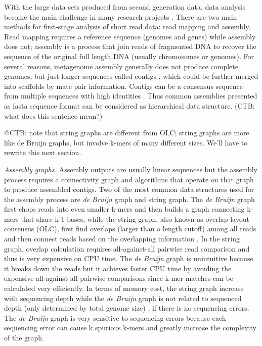 \documentclass[]{msu-thesis}
\begin{document}
With the large data sets produced from second generation data, data analysis
become the main challenge in many research projects
\cite{qin_human_2010,pell_scaling_2012}. There are two main methods
for first-stage analysis of short read data: read mapping and assembly. Read mapping requires a
reference sequence (genomes and genes) while assembly does not; assembly
is a process that join reads of fragmented DNA to recover the sequence
of the original full length DNA (usually chromosomes or genomes). For several
reasons, metagenome assembly generally does not produce complete genomes, but just
longer sequences called contigs
\cite{qin_human_2010,howe_tackling_2014}, which could be further
merged into scaffolds by mate pair information. Contigs can be a
consensus sequence from multiple sequences with high identities
\cite{zerbino_velvet:_2008}. Thus common assemblies presented as fasta
sequence format can be considered as hierarchical data structure.
(CTB: what does this sentence mean?)

@CTB: note that string graphs are different from OLC; string graphs
are more like de Bruijn graphs, but involve k-mers of many different sizes.
We'll have to rewrite this next section.

\textit{Assembly graphs. } Assembly outputs are usually linear
sequences but the assembly process requires a connectivity graph and
algorithms that operate on that graph to produce assembled contigs. Two of the most common data structures used for the assembly
process are \textit{de Bruijn} graph and string graph.  The \textit{de
  Bruijn} graph first chops reads into even smaller k-mers and then
builds a graph connecting k-mers that share k-1 bases, while the string
graph, also known as overlap-layout-consensus (OLC), first find
overlaps (larger than a length cutoff) among all reads and then
connect reads based on the overlapping information
\cite{zerbino_velvet:_2008,simpson_efficient_2012}. In the string
graph, overlap calculation requires all-against-all pairwise read
comparison and thus is very expensive on CPU time. The \textit{de
  Bruijn} graph is unintuitive because it breaks down the reads but it
achieves faster CPU time by avoiding the expensive all-against all
pairwise comparisons since k-mer matches can be calculated very efficiently.
In terms of memory
cost, the string graph increase with sequencing depth while the
\textit{de Bruijn} graph is not related to sequenced depth (only
determined by total genome size) \cite{li_comparison_2012}, if there
is no sequencing errors. The \textit{de Bruijn} graph is very
sensitive to sequencing errors because each sequencing error can cause
k spurious k-mers and greatly increase the complexity of the graph.
\end{document}
